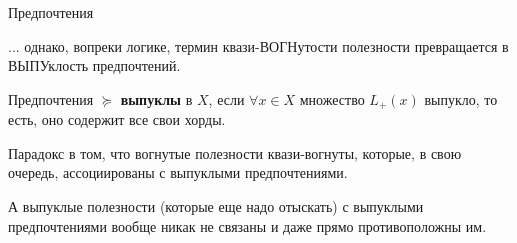 \documentclass{beamer}
\begin{document}
\begin{frame}{Предпочтения}

... однако, вопреки логике, термин квази-ВОГНутости полезности превращается в ВЫПУклость предпочтений.

\begin{definition}
Предпочтения $\succcurlyeq$ \textbf{выпуклы} в $X$, если $\forall x \in X$ множество $L_{+}(x)$ выпукло, то есть, оно содержит все свои хорды. 
\end{definition}

Парадокс в том, что вогнутые полезности квази-вогнуты, которые, в свою очередь, ассоциированы с выпуклыми предпочтениями. 

А выпуклые полезности (которые еще надо отыскать) с выпуклыми предпочтениями вообще никак не связаны и даже прямо противоположны им. 

\end{frame}
\end{document}
